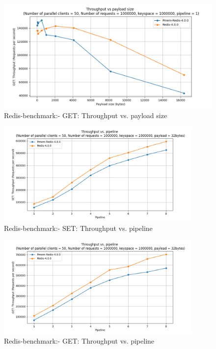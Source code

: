\documentclass[11pt,swedish, openany, oneside]{book}
\begin{document}
\begin{figure}[H]
    \centering
    \caption{Redis-benchmark:- GET: Throughput vs. payload size}
    \includegraphics[width=1\textwidth]{pmem-redis/get3.png}
\end{figure}

\begin{figure}[H]
    \centering
    \caption{Redis-benchmark:- SET: Throughput vs. pipeline}
    \includegraphics[width=0.9\textwidth]{pmem-redis/set2.png}
\end{figure}

\begin{figure}[H]
    \centering
    \caption{Redis-benchmark:- GET: Throughput vs. pipeline}
    \includegraphics[width=0.9\textwidth]{pmem-redis/get2.png}
\end{figure}
\end{document}
